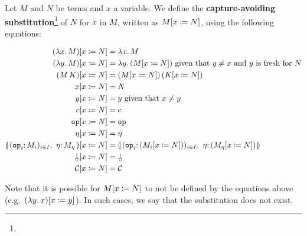 \begin{definition}
  Let $M$ and $N$ be terms and $x$ a variable. We define the
  \textbf{capture-avoiding substitution}\footnote{} of $N$ for $x$ in $M$, written as
  $M[x \coloneqq N]$, using the following equations:

  \begin{align*}
    \subst{(\lam{x}{M})}{x}{N} &= \lam{x}{M} \\
    \subst{(\lam{y}{M})}{x}{N} &= \lam{y}{(\subst{M}{x}{N})} \textrm{ given
      that } y \neq x \textrm{ and $y$ is fresh for $N$} \\
    \subst{(\ap{M}{K})}{x}{N} &= \ap{(\subst{M}{x}{N})}{(\subst{K}{x}{N})} \\
    \subst{x}{x}{N} &= N \\
    \subst{y}{x}{N} &= y \textrm{ given that } x \neq y \\
    \subst{c}{x}{N} &= c \\
    \subst{\op{op}}{x}{N} &= \op{op} \\
    \subst{\eta}{x}{N} &= \eta \\
    \subst{\cibanana}{x}{N} &= \banana{(\onto{\op{op}_i}
      (\subst{M_i}{x}{N}))_{i \in I},\ \onto{\eta} (\subst{M_\eta}{x}{N})} \\
    \subst{\cherry}{x}{N} &= \cherry \\
    \subst{\CC}{x}{N} &= \CC
  \end{align*}

  Note that it is possible for $M[x \coloneqq N]$ to not be defined by the
  equations above (e.g.\ $(\lambda y.\, x)[x \coloneqq y]$). In such cases, we
  say that the substitution does not exist.
\end{definition}

